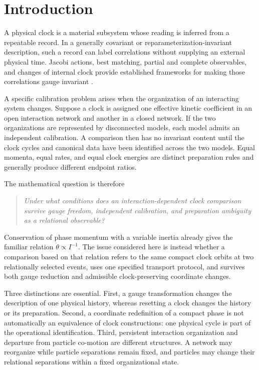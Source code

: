 \documentclass[11pt]{article}
\theoremstyle{plain}
\begin{document}
\section{Introduction}

A physical clock is a material subsystem whose reading is inferred from a repeatable record. In a generally covariant or reparameterization-invariant description, such a record can label correlations without supplying an external physical time. Jacobi actions, best matching, partial and complete observables, and changes of internal clock provide established frameworks for making those correlations gauge invariant \cite{BarbourBertotti,Rovelli,Dittrich2006,Dittrich2007,AndersonBook,HohnVanrietvelde,HohnTrinity}.

A specific calibration problem arises when the organization of an interacting
system changes.  Suppose a clock is assigned one effective kinetic coefficient
in an open interaction network and another in a closed network.  If the two
organizations are represented by disconnected models, each model admits an
independent calibration.  A comparison then has no invariant content until the
clock cycles and canonical data have been identified across the two models.
Equal momenta, equal rates, and equal clock energies are distinct preparation
rules and generally produce different endpoint ratios.

The mathematical question is therefore
\begin{quote}
\emph{Under what conditions does an interaction-dependent clock comparison survive gauge freedom, independent calibration, and preparation ambiguity as a relational observable?}
\end{quote}
Conservation of phase momentum with a variable inertia already gives the
familiar relation $\dot\theta\propto I^{-1}$.  The issue considered here is
instead whether a comparison based on that relation refers to the same compact
clock orbits at two relationally selected events, uses one specified transport
protocol, and survives both gauge reduction and admissible clock-preserving
coordinate changes.

Three distinctions are essential. First, a gauge transformation changes the description of one physical history, whereas resetting a clock changes the history or its preparation. Second, a coordinate redefinition of a compact phase is not automatically an equivalence of clock constructions: one physical cycle is part of the operational identification. Third, persistent interaction organization and departure from particle co-motion are different structures. A network may reorganize while particle separations remain fixed, and particles may change their relational separations within a fixed organizational state.
\end{document}
